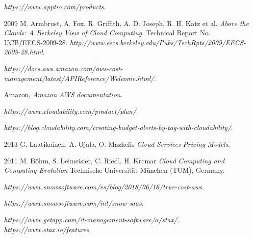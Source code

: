 \documentclass[licencjacka,en]{thesisclass}
\begin{document}
    \begin{thebibliography}{99}

        \textit{https://www.apptio.com/products}.

        2009 M. Armbrust, A. Fox, R. Griffith, A. D. Joseph, R. H. Katz et al.
        \textit{Above the Clouds: A Berkeley View of Cloud Computing.}
        Technical Report No. UCB/EECS-2009-28.
        \textit{http://www.eecs.berkeley.edu/Pubs/TechRpts/2009/EECS-2009-28.html}.

        \textit{https://docs.aws.amazon.com/aws-cost-management/latest/APIReference/Welcome.html/}.

        Amazon,
        \textit{Amazon AWS documentation}.

        \textit{https://www.cloudability.com/product/plan/}.

        \textit{https://blog.cloudability.com/creating-budget-alerts-by-tag-with-cloudability/}.

        2013 G. Laatikainen, A. Ojala, O. Mazhelis
        \textit{Cloud Services Pricing Models}.

        2011 M. Böhm, S. Leimeisier, C. Riedl, H. Krcmar
        \textit{Cloud Computing and Computing Evolution}
        Technische Universität München (TUM), Germany.

        \textit{https://www.snowsoftware.com/es/blog/2018/06/16/true-cost-aws}.

        \textit{https://www.snowsoftware.com/int/snow-saas}.

        \textit{https://www.getapp.com/it-management-software/a/stax/}.
        \textit{https://www.stax.io/features}.

    \end{thebibliography}
\end{document}
